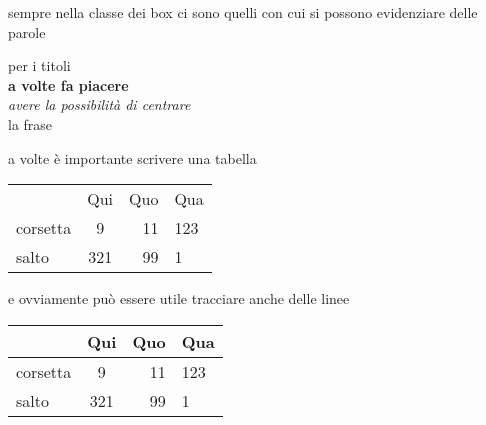 \documentclass[12pt]{letter}
\begin{document}
sempre nella classe dei box ci sono
quelli con cui si possono evidenziare delle parole

\begin{center}
per i titoli\\
{\large\bf a volte fa piacere}\\
{\Huge\it avere la possibilit\`a di centrare}\\
{\tiny la frase} 
\end{center}


\clearpage

a volte \`e importante scrivere una tabella

\begin{tabular}{lcrl}
 & Qui & Quo & Qua \\
corsetta & 9 & 11 & 123\\
salto & 321 & 99  & 1\\
\end{tabular}


e ovviamente pu\`o essere utile tracciare anche delle linee

\begin{tabular}{|l|c|r|l|}
\hline
 & Qui & Quo & Qua \\
\hline
corsetta & 9 & 11 & 123\\
\hline
salto & 321 & 99  & 1\\
\hline
\end{tabular}
\end{document}
